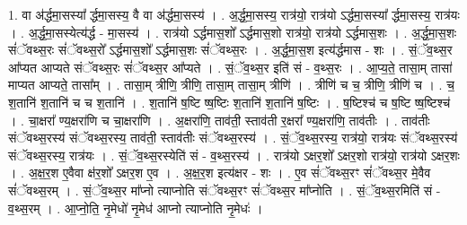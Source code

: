 \documentclass[17pt]{extarticle}
\begin{document}
1. वा अ॑र्द्धमा॒सस्या᳚ र्द्धमा॒सस्य॒ वै वा अ॑र्द्धमा॒सस्य॑ । . अ॒र्द्ध॒मा॒सस्य॒ रात्र॑यो॒ रात्र॑यो ऽर्द्धमा॒सस्या᳚ र्द्धमा॒सस्य॒ रात्र॑यः । . अ॒र्द्ध॒मा॒सस्येत्य॑र्द्ध - मा॒सस्य॑ । . रात्र॑यो ऽर्द्धमास॒शो᳚ ऽर्द्धमास॒शो रात्र॑यो॒ रात्र॑यो ऽर्द्धमास॒शः । . अ॒र्द्ध॒मा॒स॒शः सं॑ॅवथ्स॒रः सं॑ॅवथ्स॒रो᳚ ऽर्द्धमास॒शो᳚ ऽर्द्धमास॒शः सं॑ॅवथ्स॒रः । . अ॒र्द्ध॒मा॒स॒श इत्य॑र्द्धमास - शः । . सं॒ॅव॒थ्स॒र आ᳚प्यत आप्यते संॅवथ्स॒रः सं॑ॅवथ्स॒र आ᳚प्यते । . सं॒ॅव॒थ्स॒र इति॑ सं - व॒थ्स॒रः । . आ॒प्य॒ते॒ तासा॒म् तासा॑ माप्यत आप्यते॒ तासा᳚म् । . तासा॒म् त्रीणि॒ त्रीणि॒ तासा॒म् तासा॒म् त्रीणि॑ । . त्रीणि॑ च च॒ त्रीणि॒ त्रीणि॑ च । . च॒ श॒तानि॑ श॒तानि॑ च च श॒तानि॑ । . श॒तानि॑ ष॒ष्टि ष्ष॒ष्टिः श॒तानि॑ श॒तानि॑ ष॒ष्टिः । . ष॒ष्टिश्च॑ च ष॒ष्टि ष्ष॒ष्टिश्च॑ । . चा॒क्षरा᳚ ण्य॒क्षरा॑णि च चा॒क्षरा॑णि । . अ॒क्षरा॑णि॒ ताव॑ती॒ स्ताव॑ती र॒क्षरा᳚ ण्य॒क्षरा॑णि॒ ताव॑तीः । . ताव॑तीः संॅवथ्स॒रस्य॑ संॅवथ्स॒रस्य॒ ताव॑ती॒ स्ताव॑तीः संॅवथ्स॒रस्य॑ । . सं॒ॅव॒थ्स॒रस्य॒ रात्र॑यो॒ रात्र॑यः संॅवथ्स॒रस्य॑ संॅवथ्स॒रस्य॒ रात्र॑यः । . सं॒ॅव॒थ्स॒रस्येति॑ सं - व॒थ्स॒रस्य॑ । . रात्र॑यो ऽक्षर॒शो᳚ ऽक्षर॒शो रात्र॑यो॒ रात्र॑यो ऽक्षर॒शः । . अ॒क्ष॒र॒श ए॒वैवा क्ष॑र॒शो᳚ ऽक्षर॒श ए॒व । . अ॒क्ष॒र॒श इत्य॑क्षर - शः । . ए॒व सं॑ॅवथ्स॒रꣳ सं॑ॅवथ्स॒र मे॒वैव सं॑ॅवथ्स॒रम् । . सं॒ॅव॒थ्स॒र मा᳚प्नो त्याप्नोति संॅवथ्स॒रꣳ सं॑ॅवथ्स॒र मा᳚प्नोति । . सं॒ॅव॒थ्स॒रमिति॑ सं - व॒थ्स॒रम् । . आ॒प्नो॒ति॒ नृ॒मेधो॑ नृ॒मेध॑ आप्नो त्याप्नोति नृ॒मेधः॑ । \newline
\end{document}
